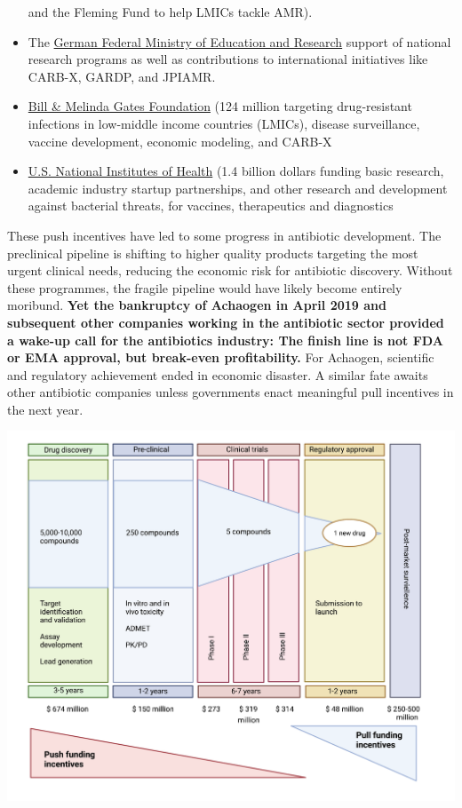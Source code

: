 \documentclass[
  11pt,
  paper=a4,
  ,captions=tableheading
]{scrartcl}
\begin{document}
\begin{itemize}
  and the Fleming Fund to help LMICs tackle AMR).
\item
  The
  \href{https://www.gesundheitsforschung-bmbf.de/en/GlobalAMRHub.php}{German
  Federal Ministry of Education and Research} support of national
  research programs as well as contributions to international
  initiatives like CARB-X, GARDP, and JPIAMR.
\item
  \href{https://www.gatesfoundation.org/}{Bill \& Melinda Gates
  Foundation} (124 million targeting drug-resistant infections in
  low-middle income countries (LMICs), disease surveillance, vaccine
  development, economic modeling, and CARB-X
\item
  \href{https://www.niaid.nih.gov/research/antimicrobial-resistance}{U.S.
  National Institutes of Health} (1.4 billion dollars funding basic
  research, academic industry startup partnerships, and other research
  and development against bacterial threats, for vaccines, therapeutics
  and diagnostics
\end{itemize}

These push incentives have led to some progress in antibiotic
development. The preclinical pipeline is shifting to higher quality
products targeting the most urgent clinical needs, reducing the economic
risk for antibiotic discovery. Without these programmes, the fragile
pipeline would have likely become entirely moribund. \textbf{Yet the
bankruptcy of Achaogen in April 2019 and subsequent other companies
working in the antibiotic sector provided a wake-up call for the
antibiotics industry: The finish line is not FDA or EMA approval, but
break-even profitability.} For Achaogen, scientific and regulatory
achievement ended in economic disaster. A similar fate awaits other
antibiotic companies unless governments enact meaningful pull incentives
in the next year.

\includegraphics[width=6.25in,height=\textheight]{images/push.png}
\end{document}
